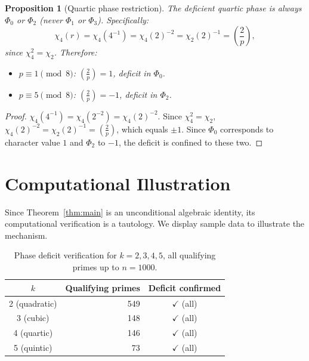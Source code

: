 \documentclass[11pt, a4paper]{article}
\newtheorem{proposition}[theorem]{Proposition}
\theoremstyle{definition}
\theoremstyle{remark}
\newcommand{\Leg}[2]{\left(\frac{#1}{#2}\right)}
\begin{document}
\begin{proposition}[Quartic phase restriction]
\label{prop:quartic}
The deficient quartic phase is always $\Phi_0$ or $\Phi_2$
\textup{(}never $\Phi_1$ or $\Phi_3$\textup{)}.
Specifically:
\[
    \chi_4(r)
    = \chi_4(4^{-1})
    = \chi_4(2)^{-2}
    = \chi_2(2)^{-1}
    = \Leg{2}{p},
\]
since $\chi_4^2 = \chi_2$.
Therefore:
\begin{itemize}[nosep]
\item $p \equiv 1 \pmod{8}$: $\Leg{2}{p} = 1$,
deficit in $\Phi_0$.
\item $p \equiv 5 \pmod{8}$: $\Leg{2}{p} = -1$,
deficit in $\Phi_2$.
\end{itemize}
\end{proposition}

\begin{proof}
$\chi_4(4^{-1})
= \chi_4(2^{-2})
= \chi_4(2)^{-2}$.
Since $\chi_4^2 = \chi_2$,
$\chi_4(2)^{-2} = \chi_2(2)^{-1} = \Leg{2}{p}$,
which equals $\pm 1$.
Since $\Phi_0$ corresponds to character value $1$ and
$\Phi_2$ to $-1$, the deficit is confined to these two.
\end{proof}

\section{Computational Illustration}\label{sec:computation}

Since Theorem~\ref{thm:main} is an unconditional algebraic
identity, its computational verification is a tautology.
We display sample data to illustrate the mechanism.

\begin{table}[H]
\centering
\caption{Phase deficit verification for $k = 2, 3, 4, 5$,
all qualifying primes up to $n = 1000$.}
\label{tab:verification}
\medskip
\begin{tabular}{@{}c r c@{}}
\toprule
$k$ & Qualifying primes & Deficit confirmed \\
\midrule
2 (quadratic) & 549 & $\checkmark$ (all) \\
3 (cubic)     & 148 & $\checkmark$ (all) \\
4 (quartic)   & 146 & $\checkmark$ (all) \\
5 (quintic)   & 73  & $\checkmark$ (all) \\
\bottomrule
\end{tabular}
\end{table}
\end{document}
